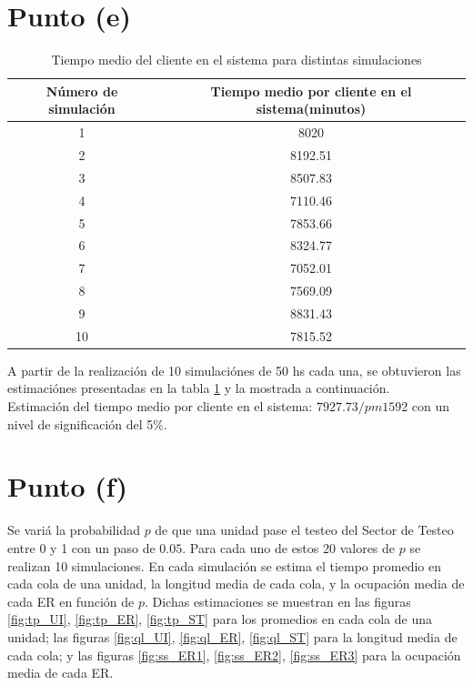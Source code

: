 \documentclass[a4paper,10pt]{article}
\begin{document}
\section{Punto (e)}

\begin{table}
\centering
\begin{tabular}{|c|c|}
\hline
  N\'umero de simulaci\'on & Tiempo medio por cliente en el sistema(minutos) \\
\hline
  1 & 8020 \\
\hline
  2 & 8192.51 \\
\hline
  3 & 8507.83 \\
\hline
  4 & 7110.46 \\
\hline
  5 & 7853.66 \\
\hline
  6 & 8324.77 \\
\hline
  7 & 7052.01 \\
\hline
  8 & 7569.09 \\
\hline
  9 & 8831.43 \\
\hline
  10 & 7815.52 \\
\hline
\end{tabular}
\caption{\label{tab:mean_sistem_time} Tiempo medio del cliente en el sistema para distintas simulaciones}
\end{table} 
A partir de la realización de 10 simulaciónes de 50 hs cada una, se obtuvieron las estimaciónes presentadas en la tabla \ref{tab:mean_sistem_time} y la mostrada a continuación.\\
Estimaci\'on del tiempo medio por cliente en el sistema: $7927.73 /pm 1592$ con un nivel de significaci\'on del 5\%.


\section{Punto (f)}

Se vari\'a la probabilidad $p$ de que una unidad pase el testeo del Sector de Testeo entre 0 y 1 con un paso de $0.05$.
Para cada uno de estos 20 valores de $p$ se realizan 10 simulaciones. En cada simulaci\'on se estima el tiempo
promedio en cada cola de una unidad, la longitud media de cada cola, y la ocupaci\'on media de cada ER en funci\'on de $p$.
Dichas estimaciones se muestran en las figuras \ref{fig:tp_UI}, \ref{fig:tp_ER}, \ref{fig:tp_ST} para los promedios en cada cola de
una unidad; las figuras \ref{fig:ql_UI}, \ref{fig:ql_ER}, \ref{fig:ql_ST} para la longitud media de cada cola; y las figuras
\ref{fig:ss_ER1}, \ref{fig:ss_ER2}, \ref{fig:ss_ER3} para la ocupaci\'on media de cada ER.
\end{document}
